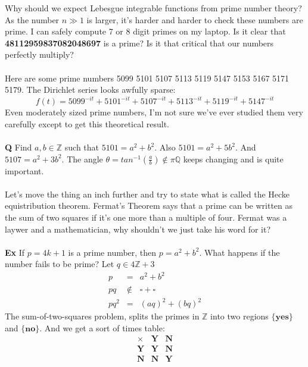 \documentclass[12pt]{article}
\begin{document}
\noindent Why should we expect Lebesgue integrable functions from prime number theory?  As the number $n \gg 1$ is larger, it's harder and harder to check these numbers are prime.  I can safely compute 7 or 8 digit primes on my laptop.  Is it clear that \textbf{48112959837082048697} is a prime?  Is it that critical that our numbers perfectly multiply? \\ \\ 
Here are some prime numbers {\color{orange!70!black}5099}   {5101}   {\color{orange!70!black}5107}   {5113}   {\color{orange!70!black}5119}   {5147}   {\color{orange!70!black}5153}   {5167}   {\color{orange!70!black}5171}   {5179}.  The Dirichlet series looks awfully sparse:
$$ f(t) = 
5099^{-it} +
5101^{-it} +
5107^{-it} +
5113^{-it} +
5119^{-it} +
5147^{-it} $$
Even moderately sized prime numbers, I'm not sure we've ever studied them very carefully except to get this theoretical result.  \\ \\
\textbf{Q} Find $a, b \in \mathbb{Z}$ such that $5101 = a^2 + b^2$.   Also $5101 = a^2 + 5b^2$.  And $5107 = a^2 + 3b^2$.  The angle $\theta = tan^{-1}(\frac{a}{b}) \notin \pi \mathbb{Q}$ keeps changing and is quite important. \\ \\
Let's move the thing an inch further and try to state what is called the Hecke equistribution theorem.  Fermat's Theorem says that a prime can be written as the sum of two squares if it's one more than a multiple of four.  Fermat was a laywer and a mathematician, why shouldn't we just take his word for it? \\ \\
\textbf{Ex} If $p = 4k+1$ is a prime number, then $p = a^2 + b^2$.  What happens if the number fails to be prime? Let $q \in 4\mathbb{Z}+3$ 
\begin{eqnarray*}
p \;\; &=& a^2 + b^2 \\
pq \;\, &\notin& \square + \square \\
pq^2 &=& (aq)^2 + (bq)^2
\end{eqnarray*}
The sum-of-two-squares problem, splits the primes in $\mathbb{Z}$ into two regions $\{\mathbf{yes}\}$ and $\{\mathbf{no}\}$.  And we get a sort of times table:
$$ 
\begin{array}{c|cc}
\times & \mathbf{Y} & \mathbf{N} \\ \hline
\mathbf{Y}       & \mathbf{Y} & \mathbf{N} \\ 
\mathbf{N}       & \mathbf{N} & \mathbf{Y}    \end{array}$$  
\end{document}
